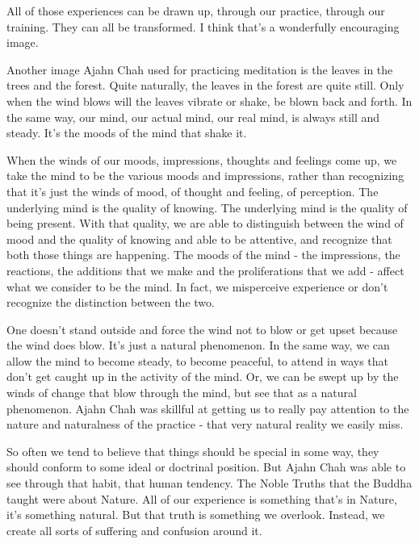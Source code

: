 \documentclass[a4paper,portrait,12pt]{article}
\begin{document}
All   of   those   experiences   can   be   drawn   up, through   our   practice,   through   our   training.   They  can  all  be  transformed.  I  think  that's  a wonderfully encouraging image.  





Another  image  Ajahn  Chah  used  for  practicing meditation  is  the  leaves  in  the  trees  and  the forest. Quite naturally, the leaves in the forest are quite  still.  Only  when  the  wind  blows  will  the leaves vibrate or shake, be blown back and forth.  In the same way, our mind, our actual mind, our real mind, is always still and steady. It's the moods of the mind that shake it.  





When  the  winds  of  our  moods,  impressions, thoughts and feelings come up, we take the mind to be  the various moods and impressions, rather than recognizing that it's just the winds of mood, of   thought   and   feeling,   of   perception.  The underlying  mind  is  the  quality  of  knowing. The underlying  mind  is  the  quality  of  being  present.  With  that  quality,  we  are  able  to  distinguish between  the  wind  of  mood  and  the  quality  of knowing  and  able  to  be  attentive,  and  recognize that both those things are happening. The moods of the mind - the impressions, the reactions, the additions that we make and the proliferations that we add - affect what we consider to be the mind.  In  fact,  we  misperceive  experience  or  don't recognize the distinction between the two. 





One doesn't stand outside and force the wind not to blow or get upset because the wind does blow.  It's just a natural phenomenon. In the same way, we  can  allow  the  mind  to  become  steady,  to become peaceful, to attend in ways that don't get caught up in the activity of the mind. Or, we can be  swept  up  by  the  winds  of  change  that  blow through  the  mind,  but  see  that  as  a  natural phenomenon. Ajahn  Chah  was  skillful  at  getting us  to  really  pay  attention  to  the  nature  and naturalness  of  the  practice  -  that  very  natural reality we easily miss. 





So often we tend to believe that things should be special in some way, they should conform to some ideal  or  doctrinal  position.  But Ajahn  Chah  was able   to   see   through   that   habit,   that   human tendency.  The  Noble  Truths  that  the  Buddha taught were about Nature. All of  our experience is  something  that's  in  Nature,  it's  something natural. But that truth is something we overlook.  Instead,  we  create  all  sorts  of  suffering  and confusion around it.  
\end{document}
